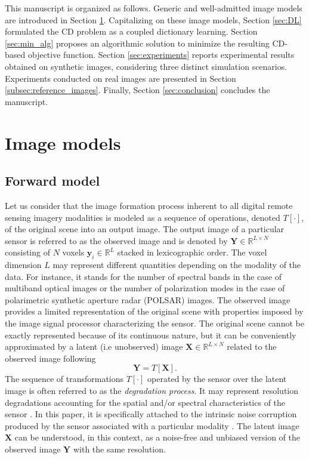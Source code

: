 \documentclass[review]{elsarticle}
\newcommand{\Ndim}{L}
\begin{document}
This manuscript is organized as follows. Generic and well-admitted image models are introduced in Section \ref{sec:models}. Capitalizing on these image models, Section \ref{sec:DL} formulated the CD problem as a coupled dictionary learning. Section \ref{sec:min_alg} proposes an algorithmic solution to minimize the resulting CD-based objective function. Section \ref{sec:experiments} reports experimental results obtained on synthetic images, considering three distinct simulation scenarios. Experiments conducted on real images are presented in Section \ref{subsec:reference_images}. Finally, Section \ref{sec:conclusion} concludes the manuscript.

\section{Image models}
\label{sec:models}

\subsection{Forward model}
\label{subsec:GFM}

Let us consider that the image formation process inherent to all digital remote sensing imagery modalities is modeled as a sequence of operations, denoted $\mathit{T}[\cdot]$, of the original scene into an output image. The output image of a particular sensor is referred to as the observed image and is denoted by $\mathbf{Y} \in \mathbb{R}^{\Ndim \times N}$
  consisting of $N$ voxels $\mathbf{y}_{i} \in \mathbb{R}^{\Ndim}$ stacked in lexicographic order. The voxel dimension $\Ndim$ may represent different quantities depending on the modality of the data. For instance, it stands for the number of spectral bands in the case of multiband optical images \citep{ferraris_robust_2017} or the number of polarization modes in the case of polarimetric synthetic aperture radar (POLSAR) images. The observed image provides a limited representation of the original scene with properties imposed by the image signal processor characterizing the sensor. The original scene cannot be exactly represented because of its continuous nature, but it can be conveniently approximated by a latent (i.e unobserved) image $\mathbf{X} \in \mathbb{R}^{\Ndim \times N}$ related to the observed image following
%
\begin{equation}
\label{eq:sensortransf}
	\mathbf{Y} = \mathit{T}[\mathbf{X}].
\end{equation}
%
The sequence of transformations $\mathit{T}[\cdot]$ operated by the sensor over the latent image is often referred to as the \emph{degradation process}. It may represent resolution degradations accounting for the spatial and/or spectral characteristics of the sensor \citep{ferraris_detecting_2017,ferraris_robust_2017}. In this paper, it is specifically attached to the intrinsic noise corruption produced by the sensor associated with a particular modality \citep{sun_alternating_2014}. The latent image $\mathbf{X}$ can be understood, in this context, as a noise-free and unbiased version of the observed image $\mathbf{Y}$ with the same resolution.
\end{document}
